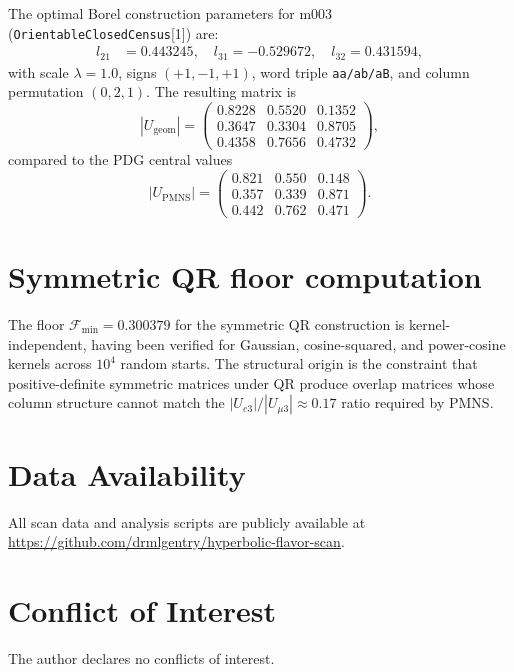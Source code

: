 \documentclass[epjc3]{svjour3}
\begin{document}
The optimal Borel construction parameters for m003
(\texttt{OrientableClosedCensus}[1]) are:
\begin{align}
l_{21} &= 0.443245, \quad l_{31} = -0.529672, \quad l_{32} = 0.431594,
\end{align}
with scale $\lambda = 1.0$, signs $(+1, -1, +1)$, word triple
\texttt{aa/ab/aB}, and column permutation $(0, 2, 1)$.
The resulting matrix is
\begin{equation}
|U_{\mathrm{geom}}| = \begin{pmatrix}
0.8228 & 0.5520 & 0.1352 \\
0.3647 & 0.3304 & 0.8705 \\
0.4358 & 0.7656 & 0.4732
\end{pmatrix},
\end{equation}
compared to the PDG central values
\begin{equation}
|U_{\mathrm{PMNS}}| = \begin{pmatrix}
0.821 & 0.550 & 0.148 \\
0.357 & 0.339 & 0.871 \\
0.442 & 0.762 & 0.471
\end{pmatrix}.
\end{equation}

\section{Symmetric QR floor computation}
\label{app:floor}

The floor $\mathcal{F}_{\min} = 0.300379$ for the symmetric QR
construction is kernel-independent, having been verified for
Gaussian, cosine-squared, and power-cosine kernels across
$10^4$ random starts. The structural origin is the constraint
that positive-definite symmetric matrices under QR produce
overlap matrices whose column structure cannot match the
$|U_{e3}|/|U_{\mu 3}| \approx 0.17$ ratio required by PMNS.


\section*{Data Availability}
All scan data and analysis scripts are publicly available at \url{https://github.com/drmlgentry/hyperbolic-flavor-scan}.

\section*{Conflict of Interest}
The author declares no conflicts of interest.



\end{document}
